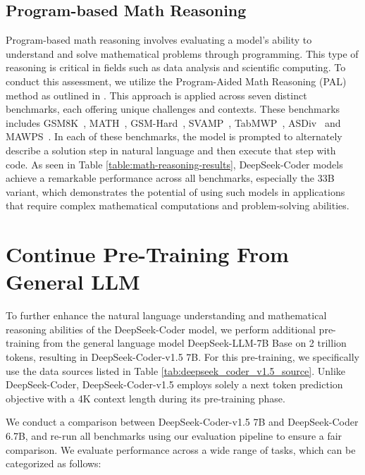 \subsection{Program-based Math Reasoning}
\label{sec:math_reasoning}
Program-based math reasoning involves evaluating a model's ability to understand and solve mathematical problems through programming. This type of reasoning is critical in fields such as data analysis and scientific computing. To conduct this assessment, we utilize the Program-Aided Math Reasoning (PAL) method as outlined in \cite{gao2023pal}. This approach is applied across seven distinct benchmarks, each offering unique challenges and contexts. These benchmarks includes GSM8K~\citep{gsm8k}, MATH~\citep{hendrycks2021measuring}, GSM-Hard~\citep{gao2023pal}, SVAMP~\citep{patel2021nlp}, TabMWP~\citep{lu2022dynamic}, ASDiv~\citep{miao2020diverse} and MAWPS~\citep{gou2023tora}. In each of these benchmarks, the model is prompted to alternately describe a solution step in natural language and then execute that step with code. As seen in Table \ref{table:math-reasoning-results}, DeepSeek-Coder models achieve a remarkable performance across all benchmarks, especially the 33B variant, which demonstrates the potential of using such models in applications that require complex mathematical computations and problem-solving abilities.

\section{Continue Pre-Training From General LLM}

To further enhance the natural language understanding and mathematical reasoning abilities of the DeepSeek-Coder model, we perform additional pre-training from the general language model DeepSeek-LLM-7B Base \citep{bi2024deepseek} on 2 trillion tokens, resulting in  DeepSeek-Coder-v1.5 7B. For this pre-training, we specifically use the data sources listed in Table \ref{tab:deepseek_coder_v1.5_source}. Unlike DeepSeek-Coder, DeepSeek-Coder-v1.5 employs solely a next token prediction objective with a 4K context length during its pre-training phase.

We conduct a comparison between DeepSeek-Coder-v1.5 7B and DeepSeek-Coder 6.7B, and re-run all benchmarks using our evaluation pipeline to ensure a fair comparison. We evaluate performance across a wide range of tasks, which can be categorized as follows:


